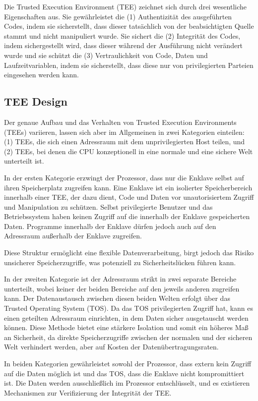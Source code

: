 Die Trusted Execution Environment (TEE) zeichnet sich durch drei wesentliche Eigenschaften aus. Sie gewährleistet die (1) Authentizität des ausgeführten Codes, indem sie sicherstellt, dass dieser tatsächlich von der beabsichtigten Quelle stammt und nicht manipuliert wurde.  Sie sichert die (2) Integrität des Codes, indem sichergestellt wird, dass dieser während der Ausführung nicht verändert wurde und sie schützt die (3) Vertraulichkeit von Code, Daten und Laufzeitvariablen, indem sie sicherstellt, dass diese nur von privilegierten Parteien eingesehen werden kann.

\subsection{TEE Design}
Der genaue Aufbau und das Verhalten von Trusted Execution Environments (TEEs) variieren, lassen sich aber im Allgemeinen in zwei Kategorien einteilen: (1) TEEs, die sich einen Adressraum mit dem unprivilegierten Host teilen, und (2) TEEs, bei denen die CPU konzeptionell in eine normale und eine sichere Welt unterteilt ist.

In der ersten Kategorie erzwingt der Prozessor, dass nur die Enklave selbst auf ihren Speicherplatz zugreifen kann. Eine Enklave ist ein isolierter Speicherbereich innerhalb einer TEE, der dazu dient, Code und Daten vor unautorisiertem Zugriff und Manipulation zu schützen. Selbst privilegierte Benutzer und das Betriebssystem haben keinen Zugriff auf die innerhalb der Enklave gespeicherten Daten. Programme innerhalb der Enklave dürfen jedoch auch auf den Adressraum außerhalb der Enklave zugreifen.

Diese Struktur ermöglicht eine flexible Datenverarbeitung, birgt jedoch das Risiko unsicherer Speicherzugriffe, was potenziell zu Sicherheitslücken führen kann.

In der zweiten Kategorie ist der Adressraum strikt in zwei separate Bereiche unterteilt, wobei keiner der beiden Bereiche auf den jeweils anderen zugreifen kann. Der Datenaustausch zwischen diesen beiden Welten erfolgt über das Trusted Operating System (TOS). Da das TOS privilegierten Zugriff hat, kann es einen geteilten Adressraum einrichten, in dem Daten sicher ausgetauscht werden können. Diese Methode bietet eine stärkere Isolation und somit ein höheres Maß an Sicherheit, da direkte Speicherzugriffe zwischen der normalen und der sicheren Welt verhindert werden, aber auf Kosten der Datenübertragungsraten.

In beiden Kategorien gewährleistet sowohl der Prozessor, dass extern kein Zugriff auf die Daten möglich ist und das TOS, dass die Enklave nicht kompromittiert ist. Die Daten werden ausschließlich im Prozessor entschlüsselt, und es existieren Mechanismen zur Verifizierung der Integrität der TEE.

